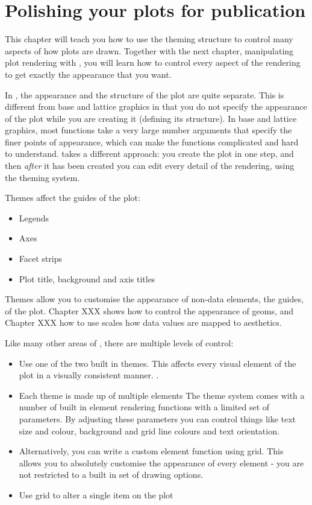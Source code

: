 

\chapter{Polishing your plots for publication}
\label{cha:theming}

This chapter will teach you how to use the theming structure to control many aspects of how \ggplot plots are drawn.  Together with the next chapter, manipulating plot rendering with , you will learn how to control every aspect of the rendering to get exactly the appearance that you want.

In \ggplot, the appearance and the structure of the plot are quite separate.  This is different from base and lattice graphics in that you do not specify the appearance of the plot while you are creating it (defining its structure).  In base and lattice graphics, most functions take a very large number arguments that specify the finer points of appearance, which can make the functions complicated and hard to understand.  \ggplot takes a different approach: you create the plot in one step, and then {\em after} it has been created you can edit every detail of the rendering, using the theming system.

Themes affect the guides of the plot:

\begin{itemize}
  \item Legends
  \item Axes
  \item Facet strips
  \item Plot title, background and axis titles
\end{itemize}

Themes allow you to customise the appearance of non-data elements, the guides, of the plot. Chapter XXX shows how to control the appearance of geoms, and Chapter XXX how to use scales  how data values are mapped to aesthetics.

Like many other areas of \ggplot, there are multiple levels of control:

\begin{itemize}
  \item Use one of the two built in themes.  This affects every visual element of the plot in a visually consistent manner.  .

  \item Each theme is made up of multiple elements The theme system comes with a number of built in element rendering functions with a limited set of parameters.  By adjusting these parameters you can control things like text size and colour, background and grid line colours and text orientation. 
  
  \item Alternatively, you can write a custom element function using grid.  This allows you to absolutely customise the appearance of every element - you are not restricted to a built in set of drawing options.  

  \item Use grid to alter a single item on the plot
\end{itemize}

